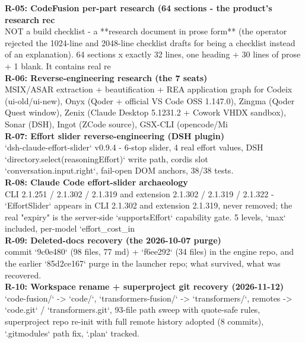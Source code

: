 {\noindent\textbf{R-05: CodeFusion per-part research (64 sections - the product's research rec}\\
\noindent NOT a build checklist - a **research document in prose form** (the operator rejected the   1024-line and 2048-line checklist drafts for being a checklist instead of an explanation).   64 sections x exactly 32 lines, one heading + 30 lines of prose + 1 blank. It contains real   re\\

\noindent\textbf{R-06: Reverse-engineering research (the 7 seats)}\\
\noindent MSIX/ASAR extraction + beautification + REA application graph for Codeix   (ui-old/ui-new), Onyx (Qoder + official VS Code OSS 1.147.0), Zingma (Qoder Quest window),   Zenix (Claude Desktop 5.1231.2 + Cowork VHDX sandbox), Sonar (DSH), Ingot (ZCode source),   GSX-CLI (opencode/Mi\\

\noindent\textbf{R-07: Effort slider reverse-engineering (DSH plugin)}\\
\noindent `dsh-claude-effort-slider` v0.9.4 - 6-stop slider, 4 real effort values, DSH   `directory.select({reasoningEffort})` write path, cordis slot `conversation.input.right`,   fail-open DOM anchors, 38/38 tests.\\

\noindent\textbf{R-08: Claude Code effort-slider archaeology}\\
\noindent CLI 2.1.251 / 2.1.302 / 2.1.319 and extension 2.1.302 / 2.1.319 / 2.1.322 -   `EffortSlider` appears in CLI 2.1.302 and extension 2.1.319, never removed; the real   "expiry" is the server-side `supportsEffort` capability gate. 5 levels, `max` included,   per-model `effort\_cost\_in\\

\noindent\textbf{R-09: Deleted-docs recovery (the 2026-10-07 purge)}\\
\noindent commit `9c0e480` (98 files, 77 md) + `f6ee292` (34 files) in the engine repo,   and the earlier `85d2ce167` purge in the launcher repo; what survived, what was recovered.\\

\noindent\textbf{R-10: Workspace rename + superproject git recovery (2026-11-12)}\\
\noindent `code-fusion/` -> `code/`, `transformers-fusion/` -> `transformers/`, remotes ->   `code.git` / `transformers.git`, 93-file path sweep with quote-safe rules, superproject repo   re-init with full remote history adopted (8 commits), `.gitmodules` path fix, `.plan` tracked.\\

}
